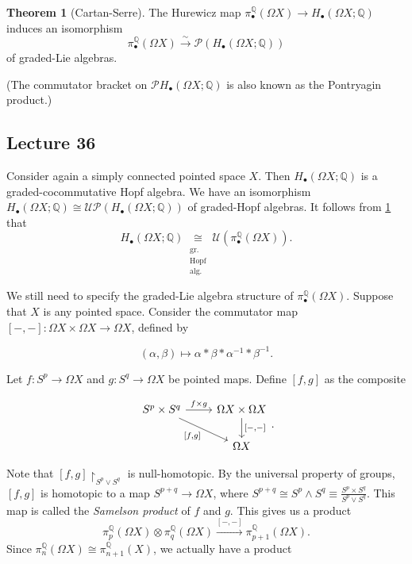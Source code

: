 \documentclass[10pt,letterpaper,cm]{nupset}
\theoremstyle{definition}
\theoremstyle{theorem}
\newtheorem{theorem}[defn]{Theorem}
\theoremstyle{remark}
\renewcommand{\P}{\mathcal P}
\newcommand{\Q}{\mathbb Q}
\newcommand{\U}{\mathcal U}
\newcommand{\1}{\mathbb{1}}
\newcommand{\0}{\vec 0}
\begin{document}
\begin{theorem}[Cartan-Serre]\label{C-S}
The Hurewicz map $\pi_{\bullet}^{\Q}(\Omega{X}) \to H_{\bullet}(\Omega{X}; \Q)$ induces an isomorphism
\[
\pi_{\bullet}^{\Q}(\Omega{X}) \xrightarrow{\sim} \P(H_{\bullet}(\Omega{X}; \Q))
\] of graded-Lie algebras.
\end{theorem}

(The commutator bracket on $\P{H_{\bullet}(\Omega{X}; \Q)}$ is also known as the Pontryagin product.)

\subsection{Lecture 36}
 
 Consider again a simply connected pointed space $X$. Then $H_{\bullet}(\Omega{X}; \Q)$ is a graded-cocommutative Hopf algebra. We have an isomorphism   $H_{\bullet}(\Omega{X}; \Q)  \cong \U{\P(H_{\bullet}(\Omega{X}; \Q))}$ of graded-Hopf algebras. It follows from \cref{C-S} that 
 \[ \label{Hiso}
 H_{\bullet}(\Omega{X}; \Q) \underset{\substack{ \\ \text{gr.} \\ \text{Hopf} \\ \text{alg.}}}{\cong} \U(\pi_{\bullet}^{\Q}(\Omega{X}))
 \tag{$\dagger$}.\]

We still need to specify the graded-Lie algebra structure of $\pi_{\bullet}^{\Q}(\Omega{X})$. Suppose that $X$ is any pointed space. Consider the commutator map $\left[{-}, {-}\right] : \Omega{X} \times \Omega{X} \to \Omega{X}$, defined by

\[
\left(\alpha, \beta\right) \mapsto \alpha \ast \beta \ast \alpha^{-1}\ast \beta^{-1}
.\] 

Let $f : S^p \to \Omega{X}$ and $g : S^q \to \Omega{X}$ be pointed maps. Define $\left[f,g\right]$ as the composite

\[
\begin{tikzcd}
	{S^p \times S^q} & {\Omega{X} \times \Omega{X}} \\
	& {\Omega{X}}
	\arrow["{f\times g}", from=1-1, to=1-2]
	\arrow["{\left[{-}, {-}\right]}", from=1-2, to=2-2]
	\arrow["{\left[f,g\right]}"', from=1-1, to=2-2]
\end{tikzcd}.
\]

Note that $\left[f,g\right]\restriction_{S^p \vee S^q}$ is null-homotopic. By the universal property of groups,  $\left[f,g\right]$ is homotopic to a map $S^{p+q} \to \Omega{X}$, where $S^{p+q} \cong S^p \land S^q  \equiv \frac{S^p \times S^q}{S^p \vee S^q}$.  This map is called the \textit{Samelson product} of $f$ and $g$. This gives us a product
\[
\pi_p^{\Q}(\Omega{X}) \otimes \pi_q^{\Q}(\Omega{X}) \xrightarrow{\left[{-}, {-}\right]} \pi_{p+1}^{\Q}(\Omega{X}).
\]
Since $\pi_n^{\Q}(\Omega{X}) \cong \pi_{n+1}^{\Q}(X)$, we actually have a product
\end{document}
